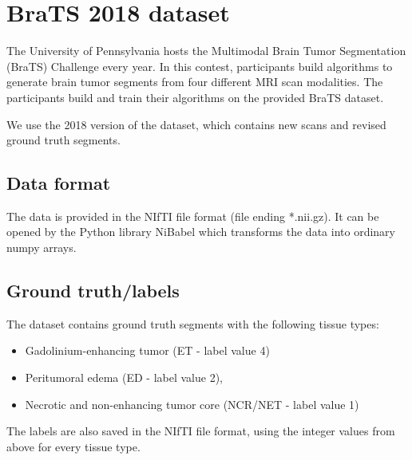 \section{BraTS 2018 dataset}
The University of Pennsylvania hosts the Multimodal Brain Tumor Segmentation (BraTS) Challenge \cite{bratschallenge}  every year. In this contest, participants build algorithms to generate brain tumor segments from four different MRI scan modalities. The participants build and train their algorithms on the provided BraTS \cite{menze2015multimodal} dataset.

We use the 2018 version of the dataset, which contains new scans and revised ground truth segments.

\subsection{Data format}
The data is provided in the NIfTI file format (file ending *.nii.gz). It can be opened by the Python library NiBabel\cite{nibabel} which transforms the data into ordinary numpy arrays.

\subsection{Ground truth/labels}
The dataset contains ground truth segments with the following tissue types:

\begin{itemize}
    \item Gadolinium-enhancing tumor (ET - label value 4)
    \item Peritumoral edema (ED - label value 2),
    \item Necrotic and non-enhancing tumor core (NCR/NET - label value 1)
\end{itemize}

The labels are also saved in the NIfTI file format, using the integer values from above for every tissue type.
